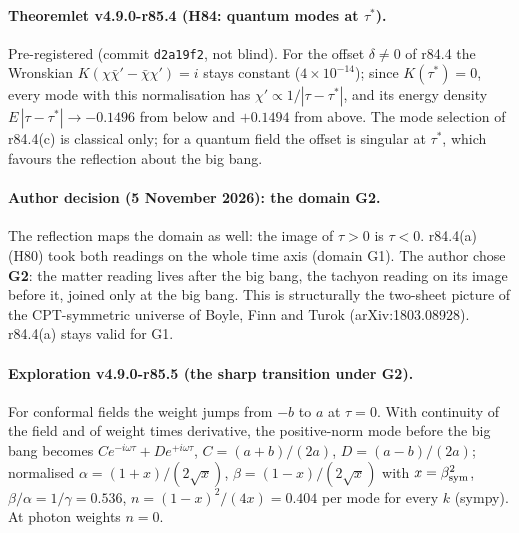 \paragraph{Theoremlet v4.9.0-r85.4 (H84: quantum modes at \(\tau^*\)).}
Pre-registered (commit \texttt{d2a19f2}, not blind).  For the offset \(\delta\neq0\) of r84.4 the Wronskian \(K(\chi\bar\chi'-\bar\chi\chi')=i\) stays constant
(\(4\times10^{-14}\)); since \(K(\tau^*)=0\), every mode with this normalisation has \(\chi'\propto1/|\tau-\tau^*|\), and its energy density
\(E\,|\tau-\tau^*|\to-0.1496\) from below and \(+0.1494\) from above.  The mode selection of r84.4(c) is classical only; for a quantum field
the offset is singular at \(\tau^*\), which favours the reflection about the big bang.

\paragraph{Author decision (5 November 2026): the domain G2.}
The reflection maps the domain as well: the image of \(\tau>0\) is \(\tau<0\).  r84.4(a) (H80) took both readings on the whole time axis
(domain G1).  The author chose \textbf{G2}: the matter reading lives after the big bang, the tachyon reading on its image before it, joined
only at the big bang.  This is structurally the two-sheet picture of the CPT-symmetric universe of Boyle, Finn and Turok
(arXiv:1803.08928).  r84.4(a) stays valid for G1.

\paragraph{Exploration v4.9.0-r85.5 (the sharp transition under G2).}
For conformal fields the weight jumps from \(-b\) to \(a\) at \(\tau=0\).  With continuity of the field and of weight times derivative, the
positive-norm mode before the big bang becomes \(C e^{-i\omega\tau}+De^{+i\omega\tau}\), \(C=(a+b)/(2a)\), \(D=(a-b)/(2a)\); normalised
\(\alpha=(1+x)/(2\sqrt x)\), \(\beta=(1-x)/(2\sqrt x)\) with \(x=\beta_{\mathrm{sym}}^2\), \(\beta/\alpha=1/\gamma=0.536\), \(n=(1-x)^2/(4x)=0.404\) per mode for every \(k\)
(sympy).  At photon weights \(n=0\).

